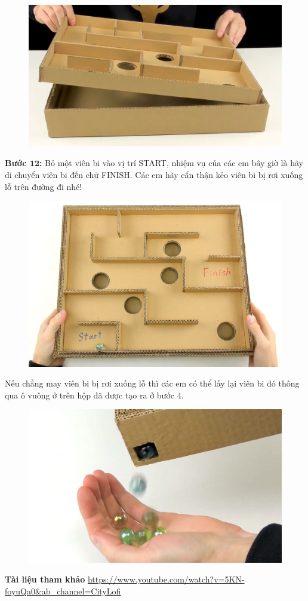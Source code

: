 \begin{multicols}{2}
\begin{figure}[H]
		\vspace*{1pt}
		\includegraphics[width= 0.8\linewidth]{20}
		\vspace*{-10pt}
	\end{figure}
	\textbf{\color{toancuabi}Bước $\pmb{12}$:} Bỏ một viên bi vào vị trí START, nhiệm vụ của các em bây giờ là hãy di chuyển viên bi đến chữ FINISH. Các em hãy cẩn thận kẻo viên bi bị rơi xuống lỗ trên đường đi nhé!
	\begin{figure}[H]
		\vspace*{-5pt}
		\centering
		\captionsetup{labelformat= empty, justification=centering}
		\includegraphics[width= 0.8\linewidth]{21}
		\vspace*{-10pt}
	\end{figure}
	Nếu chẳng may viên bi bị rơi xuống lỗ thì các em có thể lấy lại viên bi đó thông qua ô vuông ở trên hộp đã được tạo ra ở bước $4$.
	\begin{figure}[H]
		\vspace*{-5pt}
		\centering
		\captionsetup{labelformat= empty, justification=centering}
		\includegraphics[width= 0.8\linewidth]{22}
		\vspace*{-10pt}
	\end{figure}
	\textbf{\color{toancuabi}Tài liệu tham khảo}
	\vskip 0.1cm
	\url{https://www.youtube.com/watch?v=5KN-foyuQa0&ab_channel=CityLofi}
\end{multicols}
